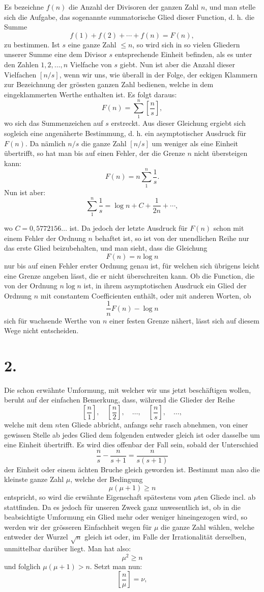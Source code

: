 \documentclass[11pt]{article}
\newcommand{\floor}[1]{\left[#1\right]}
\begin{document}
Es bezeichne $f(n)$ die Anzahl der Divisoren der ganzen Zahl $n$, und man stelle sich die Aufgabe, das sogenannte summatorische Glied dieser Function, d. h. die Summe
\[
 f(1)+f(2)+\cdots+f(n)=F(n),
\]
zu bestimmen. Ist $s$ eine ganze Zahl $\leq n$, so wird sich in so vielen Gliedern unserer Summe eine dem Divisor $s$ entsprechende Einheit befinden, als es unter den Zahlen $1,2,\ldots,n$ Vielfache von $s$ giebt. Nun ist aber die Anzahl dieser Vielfachen $\floor{n/s}$, wenn wir uns, wie überall in der Folge, der eckigen Klammern zur Bezeichnung der grössten ganzen Zahl bedienen, welche in dem eingeklammerten Werthe enthalten ist. Es folgt daraus:
\[
 F(n)=\sum_{1}^{n}\floor{\frac ns},
\]
wo sich das Summenzeichen auf $s$ erstreckt. Aus dieser Gleichung ergiebt sich sogleich eine angenäherte Bestimmung, d. h. ein asymptotischer Ausdruck für $F(n)$. Da nämlich $n/s$ die ganze Zahl $\floor{n/s}$ um weniger als eine Einheit übertrifft, so hat man bis auf einen Fehler, der die Grenze $n$ nicht übersteigen kann:
\[
 F(n)=n\sum_{1}^{n}\frac1s.
\]
Nun ist aber:
\[
 \sum_{1}^{n}\frac1s=\log n+C+\frac1{2n}+\cdots,
\]

wo $C=0{,}5772156\ldots$ ist. Da jedoch der letzte Ausdruck für $F(n)$ schon mit einem Fehler der Ordnung $n$ behaftet ist, so ist von der unendlichen Reihe nur das erste Glied beizubehalten, und man sieht, dass die Gleichung
\[
 F(n)=n\log n
\]
nur bis auf einen Fehler erster Ordnung genau ist, für welchen sich übrigens leicht eine Grenze angeben lässt, die er nicht überschreiten kann. Ob die Function, die von der Ordnung $n\log n$ ist, in ihrem asymptotischen Ausdruck ein Glied der Ordnung $n$ mit constantem Coefficienten enthält, oder mit anderen Worten, ob
\[
 \frac1n F(n)-\log n
\]
sich für wachsende Werthe von $n$ einer festen Grenze nähert, lässt sich auf diesem Wege nicht entscheiden.

\section*{2.}

Die schon erwähnte Umformung, mit welcher wir uns jetzt beschäftigen wollen, beruht auf der einfachen Bemerkung, dass, während die Glieder der Reihe
\[
 \floor{\frac n1},\quad \floor{\frac n2},\quad \ldots,\quad \floor{\frac ns},\quad \ldots,
\]
welche mit dem $n$ten Gliede abbricht, anfangs sehr rasch abnehmen, von einer gewissen Stelle ab jedes Glied dem folgenden entweder gleich ist oder dasselbe um eine Einheit übertrifft. Es wird dies offenbar der Fall sein, sobald der Unterschied
\[
 \frac ns-\frac n{s+1}=\frac{n}{s(s+1)}
\]
der Einheit oder einem ächten Bruche gleich geworden ist. Bestimmt man also die kleinste ganze Zahl $\mu$, welche der Bedingung
\[
 \mu(\mu+1)\geq n
\]
entspricht, so wird die erwähnte Eigenschaft spätestens vom $\mu$ten Gliede incl. ab stattfinden. Da es jedoch für unseren Zweck ganz unwesentlich ist, ob in die beabsichtigte Umformung ein Glied mehr oder weniger hineingezogen wird, so werden wir der grösseren Einfachheit wegen für $\mu$ die ganze Zahl wählen, welche entweder der Wurzel $\sqrt n$ gleich ist oder, im Falle der Irrationalität derselben, unmittelbar darüber liegt. Man hat also:
\[
 \mu^2\geq n
\]
und folglich $\mu(\mu+1)>n$. Setzt man nun:
\[
 \floor{\frac n\mu}=\nu,
\]
\end{document}
